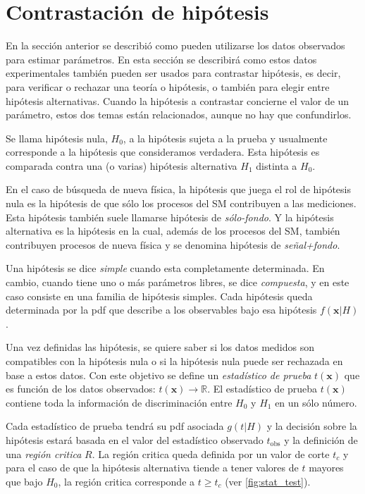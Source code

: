 \section{Contrastación de hipótesis}
\label{sec:testhypo}

En la sección anterior se describió como pueden utilizarse los datos observados
para estimar parámetros. En esta sección se describirá como estos datos
experimentales también pueden ser usados para contrastar hipótesis, es decir,
para verificar o rechazar una teoría o hipótesis, o también para elegir entre
hipótesis alternativas. Cuando la hipótesis a contrastar concierne el valor de
un parámetro, estos dos temas están relacionados, aunque no hay que confundirlos.

Se llama hipótesis nula, $H_0$, a la hipótesis sujeta a la prueba y usualmente
corresponde a la hipótesis que consideramos verdadera. Esta hipótesis es
comparada contra una (o varias) hipótesis alternativa $H_1$ distinta a $H_0$.

En el caso de búsqueda de nueva física, la hipótesis que juega el rol de
hipótesis nula es la hipótesis de que sólo los procesos del SM contribuyen a las
mediciones. Esta hipótesis también suele llamarse hipótesis de
\emph{sólo-fondo}. Y la hipótesis alternativa es la hipótesis en la cual, además
de los procesos del SM, también contribuyen procesos de nueva física y se
denomina hipótesis de \emph{se\~nal+fondo}.

Una hipótesis se dice \emph{simple} cuando esta completamente determinada. En
cambio, cuando tiene uno o más parámetros libres, se dice \emph{compuesta}, y
en este caso consiste en una familia de hipótesis simples. Cada hipótesis queda
determinada por la pdf que describe a los observables bajo esa hipótesis
$f(\bm{x}|H)$.

Una vez definidas las hipótesis, se quiere saber si los datos medidos son
compatibles con la hipótesis nula o si la hipótesis nula puede ser rechazada en
base a estos datos. Con este objetivo se define un \emph{estadístico de prueba}
$t(\bm{x})$ que es función de los datos observados: $t(\bm{x}) \to \mathbb{R}$.
El estadístico de prueba $t(\bm{x})$ contiene toda la información de
discriminación entre $H_0$ y $H_1$ en un sólo número.

Cada estadístico de prueba tendrá su pdf asociada $g(t|H)$ y la decisión sobre
la hipótesis estará basada en el valor del estadístico observado $t_\text{obs}$
y la definición de una \emph{región critica} $R$. La región critica queda
definida por un valor de corte $t_c$ y para el caso de que la hipótesis
alternativa tiende a tener valores de $t$ mayores que bajo $H_0$, la región
critica corresponde a $t \geq t_c$ (ver \cref{fig:stat_test}).

